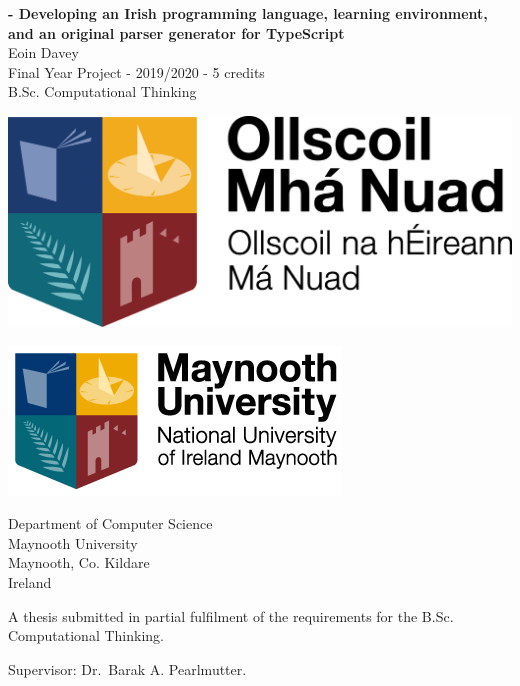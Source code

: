 \begin{titlepage}
    \begin{center}
        \begin{LARGE}
        \textbf{\Setanta{} - Developing an Irish programming language, learning environment, and an original parser generator for TypeScript}\\
            Eoin Davey\\
        Final Year Project - 2019/2020 - 5 credits\\
        B.Sc. Computational Thinking\\

        \vspace{10mm}

        \begin{minipage}[t]{0.45\textwidth}
            \includegraphics[scale=0.66]{ollscoillogo}
        \end{minipage}\qquad
        \begin{minipage}[t]{0.45\textwidth}
            \includegraphics[scale=0.66]{maynoothlogo}
        \end{minipage}

        \vspace{25mm}

        Department of Computer Science\\
        Maynooth University\\
        Maynooth, Co. Kildare\\
        Ireland
        \end{LARGE}

        \vspace{20mm}

        \begin{large}A thesis submitted in partial fulfilment of the requirements for the B.Sc. Computational Thinking.\end{large}

        \begin{LARGE}Supervisor: Dr.\ Barak A. Pearlmutter.\end{LARGE}
    \end{center}
\end{titlepage}
